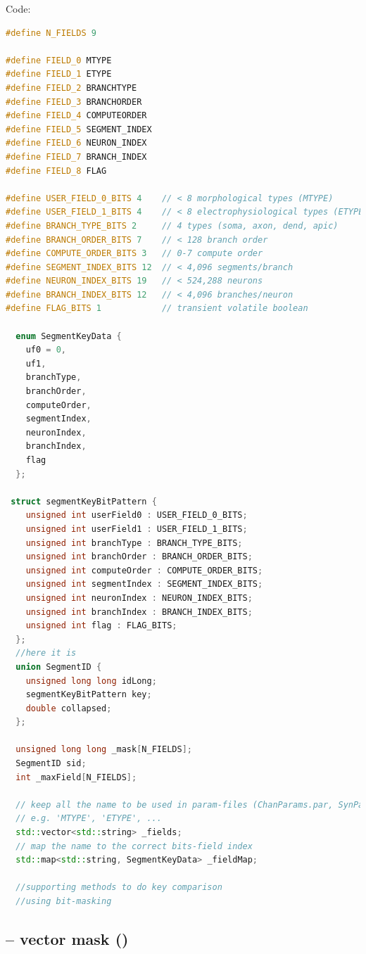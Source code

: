 Code:
{\small
\begin{lstlisting}[language=C++]
#define N_FIELDS 9

#define FIELD_0 MTYPE
#define FIELD_1 ETYPE
#define FIELD_2 BRANCHTYPE
#define FIELD_3 BRANCHORDER
#define FIELD_4 COMPUTEORDER
#define FIELD_5 SEGMENT_INDEX
#define FIELD_6 NEURON_INDEX
#define FIELD_7 BRANCH_INDEX
#define FIELD_8 FLAG

#define USER_FIELD_0_BITS 4    // < 8 morphological types (MTYPE)
#define USER_FIELD_1_BITS 4    // < 8 electrophysiological types (ETYPE)
#define BRANCH_TYPE_BITS 2     // 4 types (soma, axon, dend, apic)
#define BRANCH_ORDER_BITS 7    // < 128 branch order
#define COMPUTE_ORDER_BITS 3   // 0-7 compute order
#define SEGMENT_INDEX_BITS 12  // < 4,096 segments/branch
#define NEURON_INDEX_BITS 19   // < 524,288 neurons
#define BRANCH_INDEX_BITS 12   // < 4,096 branches/neuron
#define FLAG_BITS 1            // transient volatile boolean

  enum SegmentKeyData {
    uf0 = 0,
    uf1,
    branchType,
    branchOrder,
    computeOrder,
    segmentIndex,
    neuronIndex,
    branchIndex,
    flag
  };

 struct segmentKeyBitPattern {
    unsigned int userField0 : USER_FIELD_0_BITS;
    unsigned int userField1 : USER_FIELD_1_BITS;
    unsigned int branchType : BRANCH_TYPE_BITS;
    unsigned int branchOrder : BRANCH_ORDER_BITS;
    unsigned int computeOrder : COMPUTE_ORDER_BITS;
    unsigned int segmentIndex : SEGMENT_INDEX_BITS;
    unsigned int neuronIndex : NEURON_INDEX_BITS;
    unsigned int branchIndex : BRANCH_INDEX_BITS;
    unsigned int flag : FLAG_BITS;
  };
  //here it is
  union SegmentID {
    unsigned long long idLong;
    segmentKeyBitPattern key;
    double collapsed;
  };
  
  unsigned long long _mask[N_FIELDS];
  SegmentID sid;
  int _maxField[N_FIELDS];
  
  // keep all the name to be used in param-files (ChanParams.par, SynParams.par)
  // e.g. 'MTYPE', 'ETYPE', ...  
  std::vector<std::string> _fields;
  // map the name to the correct bits-field index
  std::map<std::string, SegmentKeyData> _fieldMap;
  
  //supporting methods to do key comparison
  //using bit-masking
\end{lstlisting}
}


\subsection{-- vector mask ()}
\label{sec:SegmentDescriptor-vector-mask}

